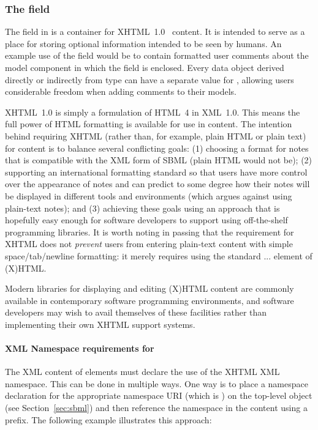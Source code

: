 \subsubsection{The  field}
\label{sec:notes}

The field  in \SBase is a container for
XHTML~1.0~\citep{pemberton:2002} content.  It is intended to serve
as a place for storing optional information intended to be seen by
humans.  An example use of the  field would be to
contain formatted user comments about the model component in which
the  field is enclosed.  Every data object derived
directly or indirectly from type \SBase can have a separate value
for , allowing users considerable freedom when adding
comments to their models.

XHTML~1.0 is simply a formulation of HTML~4 in XML~1.0.  This
means the full power of HTML formatting is available for use in
 content.  The intention behind requiring XHTML
(rather than, for example, plain HTML or plain text) for
 content is to balance several conflicting goals: (1)
choosing a format for notes that is compatible with the XML form of
SBML (plain HTML would not be); (2) supporting an international
formatting standard so that users have more control over the
appearance of notes and can predict to some degree how their notes
will be displayed in different tools and environments (which
argues against using plain-text notes); and (3) achieving these
goals using an approach that is hopefully easy enough for software
developers to support using off-the-shelf programming libraries.
It is worth noting in passing that the requirement for XHTML does
not \emph{prevent} users from entering plain-text content with
simple space/tab/newline formatting: it merely requires using the
standard ... element of (X)HTML.

Modern libraries for displaying and editing (X)HTML content are
commonly available in contemporary software programming
environments, and software developers may wish to avail themselves
of these facilities rather than implementing their own XHTML
support systems.


\paragraph{XML Namespace requirements for }

The XML content of  elements must declare the use of
the XHTML XML namespace.  This can be done in multiple ways.  One
way is to place a namespace declaration for the appropriate
namespace URI (which is ) on the
top-level \Sbml object (see Section~\ref{sec:sbml}) and then
reference the namespace in the  content using a
prefix.  The following example illustrates this approach:

